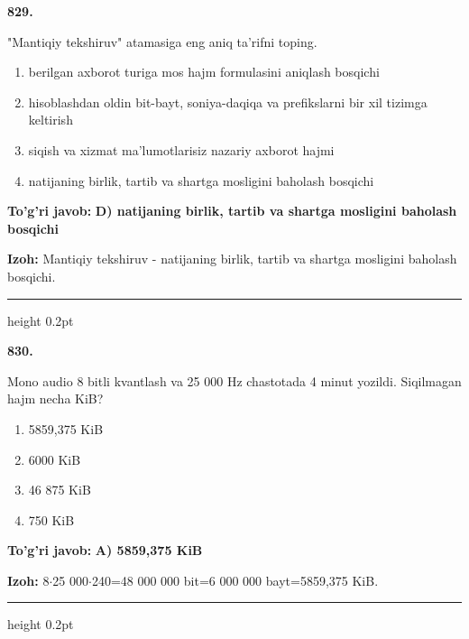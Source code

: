 \documentclass[10pt,a4paper,oneside]{article}
\begin{document}
\noindent\textbf{\color{ink}829.}
\par
"Mantiqiy tekshiruv" atamasiga eng aniq ta'rifni toping.
\begin{enumerate}[label=\Alph*),leftmargin=9mm]
\item berilgan axborot turiga mos hajm formulasini aniqlash bosqichi
\item hisoblashdan oldin bit-bayt, soniya-daqiqa va prefikslarni bir xil tizimga keltirish
\item siqish va xizmat ma'lumotlarisiz nazariy axborot hajmi
\item natijaning birlik, tartib va shartga mosligini baholash bosqichi
\end{enumerate}
\begin{tcolorbox}[enhanced,breakable,colback=teal!4,colframe=teal!50!black,boxrule=0.5pt,arc=1.1mm,left=3mm,right=3mm,top=1.7mm,bottom=1.7mm,before skip=2mm,after skip=2mm]
\textbf{\color{teal}To'g'ri javob:} \textbf{D) natijaning birlik, tartib va shartga mosligini baholash bosqichi}
\par\smallskip
\textbf{Izoh:} Mantiqiy tekshiruv - natijaning birlik, tartib va shartga mosligini baholash bosqichi.
\end{tcolorbox}
\vspace{2mm}\hrule height 0.2pt \vspace{3mm}

\noindent\textbf{\color{ink}830.}
\par
Mono audio 8 bitli kvantlash va 25 000 Hz chastotada 4 minut yozildi. Siqilmagan hajm necha KiB?
\begin{enumerate}[label=\Alph*),leftmargin=9mm]
\item 5859,375 KiB
\item 6000 KiB
\item 46 875 KiB
\item 750 KiB
\end{enumerate}
\begin{tcolorbox}[enhanced,breakable,colback=teal!4,colframe=teal!50!black,boxrule=0.5pt,arc=1.1mm,left=3mm,right=3mm,top=1.7mm,bottom=1.7mm,before skip=2mm,after skip=2mm]
\textbf{\color{teal}To'g'ri javob:} \textbf{A) 5859,375 KiB}
\par\smallskip
\textbf{Izoh:} 8\ensuremath{\cdot}25 000\ensuremath{\cdot}240=48 000 000 bit=6 000 000 bayt=5859,375 KiB.
\end{tcolorbox}
\vspace{2mm}\hrule height 0.2pt \vspace{3mm}
\end{document}
